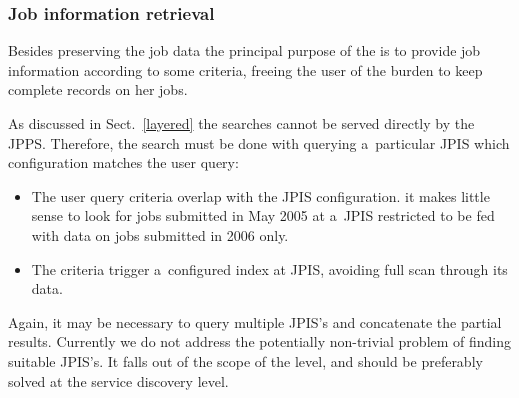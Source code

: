 \subsubsection{Job information retrieval}
Besides preserving the job data
the principal purpose of the \JP is to provide job information
according to some criteria, 
freeing the user of the burden to keep complete records on her jobs.

As discussed in Sect.~\ref{layered} the searches cannot be served
directly by the JPPS.
Therefore, the search must be done with querying a~particular JPIS
which configuration matches the user query:
\begin{itemize}
\item The user query criteria overlap with the JPIS configuration.
\Eg it makes little sense to look for
jobs submitted in May 2005 at a~JPIS restricted to be fed with data on
jobs submitted in 2006 only.

\item The criteria trigger a~configured index at JPIS, avoiding
full scan through its data.
\end{itemize}
Again, it may be necessary to query multiple JPIS's and concatenate
the partial results.
Currently we do not address the potentially non-trivial problem of finding 
suitable JPIS's. 
It falls out of the scope of the \JP level, and should be preferably
solved at the service discovery level. 


